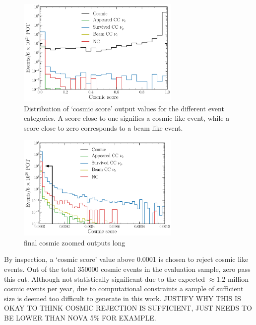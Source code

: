 \begin{figure} %
    \includegraphics[width=0.7\textwidth]{diagrams/6-cvn/chipsnet/final_cosmic_outputs.pdf}
    \caption[Distribution of cosmic rejection output values]
    {Distribution of `cosmic score' output values for the different event categories. A score
        close to one signifies a cosmic like event, while a score close to zero corresponds to a
        beam like event.}
    \label{fig:cosmic_outputs}
\end{figure}

\begin{figure} %
    \includegraphics[width=0.7\textwidth]{diagrams/6-cvn/chipsnet/final_cosmic_zoomed_outputs.pdf}
    \caption[final cosmic zoomed outputs short]
    {final cosmic zoomed outputs long}
    \label{fig:cosmic_zoomed_outputs}
\end{figure}

By inspection, a `cosmic score' value above 0.0001 is chosen to reject cosmic like events. Out of
the total 350000 cosmic events in the evaluation sample, zero pass this cut. Although not
statistically significant due to the expected $\approx$1.2 million cosmic events per year, due to
computational constraints a sample of sufficient size is deemed too difficult to generate in this
work. JUSTIFY WHY THIS IS OKAY TO THINK COSMIC REJECTION IS SUFFICIENT, JUST NEEDS TO BE LOWER
THAN NOVA 5\% FOR EXAMPLE.

